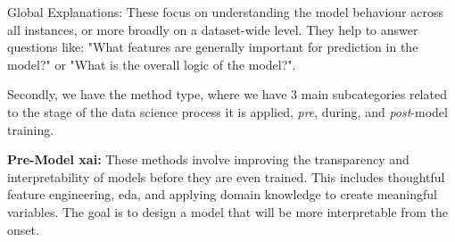 Global Explanations: These focus on understanding the model behaviour across all instances, or more broadly on a dataset-wide level. They help to answer questions like: "What features are generally important for prediction in the model?" or "What is the overall logic of the model?". 

Secondly, we have the method type, where we have 3 main subcategories related to the stage of the data science process it is applied, \textit{pre}, during, and \textit{post}-model training.

\textbf{Pre-Model \ac{xai}:} These methods involve improving the transparency and interpretability of models before they are even trained. This includes thoughtful feature engineering, \ac{eda}, and applying domain knowledge to create meaningful variables. The goal is to design a model that will be more interpretable from the onset.

